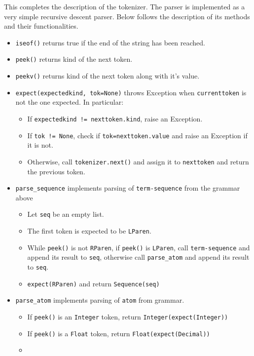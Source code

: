 This completes the description of the tokenizer. The parser is implemented as a very simple recursive descent parser. Below follows the description of its methods and their functionalities.

\begin{itemize}
\item
\texttt{iseof()} returns true if the end of the string has been reached.

\item
\texttt{peek()} returns kind of the next token. 

\item
\texttt{peekv()} returns kind of the next token along with it's value.

\item 
\texttt{expect(expectedkind, tok=None)} throws Exception when \texttt{currenttoken} is not the one expected. In particular:
	\begin{itemize}
		\item
		If \texttt{expectedkind != nexttoken.kind}, raise an Exception.
		\item
		If \texttt{tok != None}, check if \texttt{tok=nexttoken.value} and raise an Exception if it is not.
		\item
		Otherwise, call \texttt{tokenizer.next()} and assign it to \texttt{nexttoken} and return the previous token. 
	\end{itemize}

\item 
	\texttt{parse\_sequence} implements parsing of \texttt{term-sequence} from the grammar above
	\begin{itemize}
		\item
		Let \texttt{seq} be an empty list.

		\item
		The first token is expected to be \texttt{LParen}.

		\item
		While \texttt{peek()} is not \texttt{RParen}, if \texttt{peek()} is \texttt{LParen}, call \texttt{term-sequence} and append its result to \texttt{seq}, otherwise call \texttt{parse\_atom} and append its result to \texttt{seq}.
	
		\item
		\texttt{expect(RParen)} and return \texttt{Sequence(seq)}
	\end{itemize}

\item
\texttt{parse\_atom} implements parsing of \texttt{atom} from grammar.
	\begin{itemize}
	\item
		If \texttt{peek()} is an \texttt{Integer} token, return \texttt{Integer(expect(Integer))}
	\item
		If \texttt{peek()} is a \texttt{Float} token, return \texttt{Float(expect(Decimal))}
	\item


\end{itemize}
\end{itemize}
